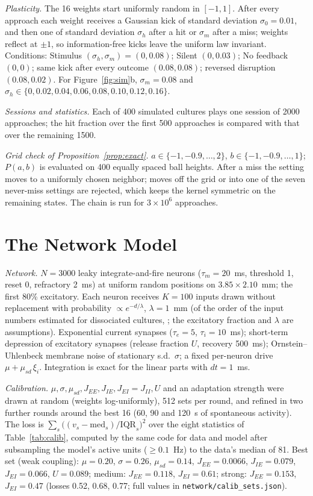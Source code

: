 \documentclass[12pt]{article}
\numberwithin{equation}{section}
\begin{document}
\emph{Plasticity.} The 16 weights start uniformly random in $[-1,1]$. After every approach each weight receives a Gaussian kick of standard deviation $\sigma_0=0.01$, and then one of standard deviation $\sigma_h$ after a hit or $\sigma_m$ after a miss; weights reflect at $\pm1$, so information-free kicks leave the uniform law invariant. Conditions: Stimulus $(\sigma_h,\sigma_m)=(0,0.08)$; Silent $(0,0.03)$; No feedback $(0,0)$; same kick after every outcome $(0.08,0.08)$; reversed disruption $(0.08,0.02)$. For Figure~\ref{fig:sim}b, $\sigma_m=0.08$ and $\sigma_h\in\{0,0.02,0.04,0.06,0.08,0.10,0.12,0.16\}$.

\emph{Sessions and statistics.} Each of 400 simulated cultures plays one session of 2000 approaches; the hit fraction over the first 500 approaches is compared with that over the remaining 1500.

\emph{Grid check of Proposition~\ref{prop:exact}.} $a\in\{-1,-0.9,\dots,2\}$, $b\in\{-1,-0.9,\dots,1\}$; $P(a,b)$ is evaluated on 400 equally spaced ball heights. After a miss the setting moves to a uniformly chosen neighbor; moves off the grid or into one of the seven never-miss settings are rejected, which keeps the kernel symmetric on the remaining states. The chain is run for $3\times10^6$ approaches.

\section{The Network Model}\label{app:net}

\emph{Network.} $N=3000$ leaky integrate-and-fire neurons ($\tau_m=20$~ms, threshold 1, reset 0, refractory 2~ms) at uniform random positions on $3.85\times2.10$~mm; the first 80\% excitatory. Each neuron receives $K=100$ inputs drawn without replacement with probability $\propto e^{-d/\lambda}$, $\lambda=1$~mm (of the order of the input numbers estimated for dissociated cultures, \citealp{Soriano2008}; the excitatory fraction and $\lambda$ are assumptions). Exponential current synapses ($\tau_e=5$, $\tau_i=10$~ms); short-term depression of excitatory synapses (release fraction $U$, recovery 500~ms); Ornstein--Uhlenbeck membrane noise of stationary s.d.\ $\sigma$; a fixed per-neuron drive $\mu+\mu_{sd}\,\xi_i$. Integration is exact for the linear parts with $dt=1$~ms.

\emph{Calibration.} $\mu,\sigma,\mu_{sd},J_{EE},J_{IE},J_{EI}=J_{II},U$ and an adaptation strength were drawn at random (weights log-uniformly), 512 sets per round, and refined in two further rounds around the best 16 (60, 90 and 120~s of spontaneous activity). The loss is $\sum_s\bigl((v_s-\mathrm{med}_s)/\mathrm{IQR}_s\bigr)^2$ over the eight statistics of Table~\ref{tab:calib}, computed by the same code for data and model after subsampling the model's active units ($\ge0.1$~Hz) to the data's median of 81. Best set (weak coupling): $\mu=0.20$, $\sigma=0.26$, $\mu_{sd}=0.14$, $J_{EE}=0.0066$, $J_{IE}=0.079$, $J_{EI}=0.066$, $U=0.089$; medium: $J_{EE}=0.118$, $J_{EI}=0.61$; strong: $J_{EE}=0.153$, $J_{EI}=0.47$ (losses 0.52, 0.68, 0.77; full values in \texttt{network/calib\_sets.json}).
\end{document}

